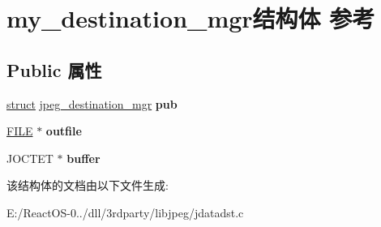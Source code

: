 \hypertarget{structmy__destination__mgr}{}\section{my\+\_\+destination\+\_\+mgr结构体 参考}
\label{structmy__destination__mgr}
\subsection*{Public 属性}
\begin{DoxyCompactItemize}
\item 
\mbox{\label{structmy__destination__mgr_a79800f27d02bb0446203ecf552034980}} 
\hyperlink{interfacestruct}{struct} \hyperlink{structjpeg__destination__mgr}{jpeg\+\_\+destination\+\_\+mgr} {\bfseries pub}
\item 
\mbox{\label{structmy__destination__mgr_a759400870db2885a9c7cf49d8d3ce38e}} 
\hyperlink{struct__iobuf}{F\+I\+LE} $\ast$ {\bfseries outfile}
\item 
\mbox{\label{structmy__destination__mgr_aa93f525223299889fb3e491a7df3d412}} 
J\+O\+C\+T\+ET $\ast$ {\bfseries buffer}
\end{DoxyCompactItemize}


该结构体的文档由以下文件生成\+:\begin{DoxyCompactItemize}
\item 
E\+:/\+React\+O\+S-\/0../dll/3rdparty/libjpeg/jdatadst.\+c\end{DoxyCompactItemize}
